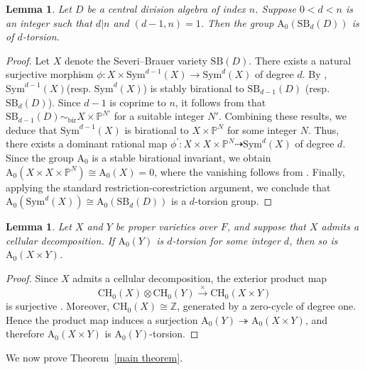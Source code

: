 \documentclass[10pt]{amsart}
\theoremstyle{plain}
\newtheorem{lemma}[thm]{Lemma}
\theoremstyle{definition}
\renewcommand{\P}{{\mathbb P}}
\begin{document}
\begin{lemma}\label{d-torsion}
     Let \(D\) be a central division algebra of index \(n\). Suppose \(0<d<n\) is an integer such that \(d|n\) and \((d-1,n)=1\). Then the group \(\mathrm{A_0}(\mathrm{SB}_d(D))\)  is of \(d\)-torsion.
\end{lemma}
    \begin{proof}
Let \(X\) denote the Severi--Brauer variety \(\mathrm{SB}(D)\). There exists a natural surjective morphism \(\phi:X \times \text{Sym}^{d-1}(X) \to \text{Sym}^d(X)\) of degree \(d\). By 
\cite[Theorem 1.5]{symmetricpowers}, \(\text{Sym}^{d-1}(X)\)(resp. \(\text{Sym}^{d}(X)\)) is stably birational to \(\mathrm{SB}_{d-1}(D)\) (resp. \(\mathrm{SB}_d(D)\)). Since \(d-1\) is coprime to \(n\), it follows from \cite[Proposition 4.1]{Florence} that \(\mathrm{SB}_{d-1}(D) \sim_{\text{bir}} X \times \P^{N'}\) for a suitable integer \(N'\).  Combining these results, we deduce that \(\text{Sym}^{d-1}(X)\) is birational to \(X \times \P^N \) for some integer \(N\). Thus, there exists a dominant rational map 
\(\phi^{'}:X \times X \times \P^N  \dashrightarrow \text{Sym}^d(X) \)
of degree \(d\). Since the group \(\mathrm{A_0}\) is a stable birational invariant, we obtain
\(\mathrm{A_0}(X \times X \times \P^N) \cong \mathrm{A_0}(X) = 0\), where the vanishing follows from \cite[Corollary 7.3]{MC}. Finally, applying the standard restriction-corestriction argument, we conclude that \(\mathrm{A_0}(\text{Sym}^d(X)) \cong \mathrm{A_0}(\mathrm{SB}_d(D)) \) is a \(d\)-torsion group. 
\end{proof}
\begin{lemma}\label{cellular decomposition}
Let \(X\) and \(Y\) be proper varieties over \(F\), and suppose that \(X\) admits a cellular decomposition. If \(\mathrm{A_0}(Y)\) is \(d\)-torsion for some integer \(d\), then so is \(\mathrm{A_0}(X \times Y)\).
\end{lemma}
\begin{proof}
Since \(X\) admits a cellular decomposition, the exterior product map
\[
\mathrm{CH_0}(X) \otimes \mathrm{CH_0}(Y) \xrightarrow{\ \times\ } \mathrm{CH_0}(X \times Y)
\]
is surjective \cite[Example~1.10.2]{fulton2012intersection}. Moreover, \(\mathrm{CH_0}(X) \cong \mathbb{Z}\), generated by a zero-cycle of degree one. Hence the product map induces a surjection \(\mathrm{A_0}(Y) \twoheadrightarrow \mathrm{A_0}(X \times Y)\), and therefore \(\mathrm{A_0}(X \times Y)\) is \(\mathrm{A_0}(Y)\)-torsion.
\end{proof}
We now prove Theorem~\ref{main theorem}.
\end{document}
